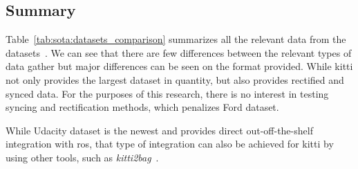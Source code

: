 \subsection{Summary}
Table~\ref{tab:sota:datasets_comparison} summarizes all the relevant data from the datasets~\cite{udacity, Pandey2011, Geiger2013a}. We can see that there are few differences between the relevant types of data gather but major differences can be seen on the format provided. While \ac{kitti} not only provides the largest dataset in quantity, but also provides rectified and synced data. For the purposes of this research, there is no interest in testing syncing and rectification methods, which penalizes Ford dataset. 

While Udacity dataset is the newest and provides direct out-off-the-shelf integration with \ac{ros}, that type of integration can also be achieved for \ac{kitti} by using other tools, such as \textit{kitti2bag}~\cite{TomasKrejci}. 
	
